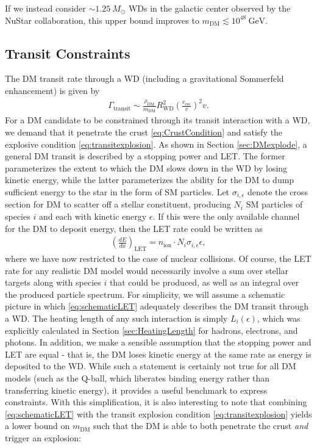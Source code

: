 \documentclass[twocolumn,showpacs,preprintnumbers,amsmath,amssymb,prd]{revtex4}
\newcommand{\GeV}{\text{GeV}}
\def\r{\right)}
\def\l{\left(}
\begin{document}
If we instead consider $\sim 1.25 ~M_{\odot}$ WDs in the galactic center observed by the NuStar collaboration, this upper bound improves to $m_\text{DM} \lesssim 10^{48} ~\GeV$. 



\subsection{Transit Constraints}
\label{sec:TransitConstraints}

The DM transit rate through a WD (including a gravitational Sommerfeld enhancement) is given by
\begin{align}
\Gamma_\text{transit} \sim \frac{\rho_{\text{DM}}}{m_\text{DM}} R_\text{WD}^2 \l\frac{v_\text{esc}}{v}\r^2 v.
\label{eq:TransitFluxCondition}
\end{align}
For a DM candidate to be constrained through its transit interaction with a WD, we demand that it penetrate the crust \eqref{eq:CrustCondition} and satisfy the explosive condition \eqref{eq:transitexplosion}. As shown in Section \ref{sec:DMexplode}, a general DM transit is described by a stopping power and LET. The former parameterizes the extent to which the DM slows down in the WD by losing kinetic energy, while the latter parameterizes the ability for the DM to dump sufficient energy to the star in the form of SM particles. Let $\sigma_{i,\epsilon}$ denote the cross section for DM to scatter off a stellar constituent, producing $N_i$ SM particles of species $i$ and each with kinetic energy $\epsilon$. If this were the only available channel for the DM to deposit energy, then the LET rate could be written as
\begin{align}
\label{eq:schematicLET}
  \left( \frac{d E}{d x} \right)_\text{LET} = n_\text{ion} \cdot N_i \sigma_{i,\epsilon} \epsilon,
\end{align}
where we have now restricted to the case of nuclear collisions. Of course, the LET rate for any realistic DM model would necessarily involve a sum over stellar targets along with species $i$ that could be produced, as well as an integral over the produced particle spectrum. For simplicity, we will assume a schematic picture in which \eqref{eq:schematicLET} adequately describes the DM transit through a WD. The heating length of any such interaction is simply $L_i(\epsilon)$, which was explicitly calculated in Section \ref{sec:HeatingLength} for hadrons, electrons, and photons. In addition, we make a sensible assumption that the stopping power and LET are equal - that is, the DM loses kinetic energy at the same rate as energy is deposited to the WD. While such a statement is certainly not true for all DM models (such as the Q-ball, which liberates binding energy rather than transferring kinetic energy), it provides a useful benchmark to express constraints. With this simplification, it is also interesting to note that combining \eqref{eq:schematicLET} with the transit explosion condition \eqref{eq:transitexplosion} yields a lower bound on $m_{\text{DM}}$ such that the DM is able to both penetrate the crust \emph{and} trigger an explosion:
\end{document}
